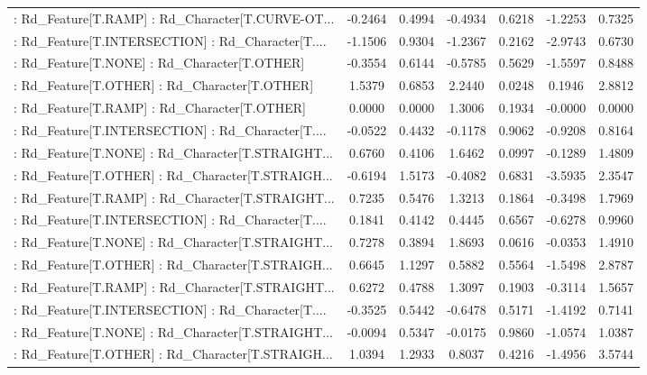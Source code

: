 \begin{longtable}{p{4cm}cccccc}
 : Rd\_Feature[T.RAMP] : Rd\_Character[T.CURVE-OT... & -0.2464 &    0.4994 & -0.4934 &       0.6218 & -1.2253 &  0.7325 \\
 : Rd\_Feature[T.INTERSECTION] : Rd\_Character[T.... & -1.1506 &    0.9304 & -1.2367 &       0.2162 & -2.9743 &  0.6730 \\
 : Rd\_Feature[T.NONE] : Rd\_Character[T.OTHER]      & -0.3554 &    0.6144 & -0.5785 &       0.5629 & -1.5597 &  0.8488 \\
 : Rd\_Feature[T.OTHER] : Rd\_Character[T.OTHER]     &  1.5379 &    0.6853 &  2.2440 &       0.0248 &  0.1946 &  2.8812 \\
 : Rd\_Feature[T.RAMP] : Rd\_Character[T.OTHER]      &  0.0000 &    0.0000 &  1.3006 &       0.1934 & -0.0000 &  0.0000 \\
 : Rd\_Feature[T.INTERSECTION] : Rd\_Character[T.... & -0.0522 &    0.4432 & -0.1178 &       0.9062 & -0.9208 &  0.8164 \\
 : Rd\_Feature[T.NONE] : Rd\_Character[T.STRAIGHT... &  0.6760 &    0.4106 &  1.6462 &       0.0997 & -0.1289 &  1.4809 \\
 : Rd\_Feature[T.OTHER] : Rd\_Character[T.STRAIGH... & -0.6194 &    1.5173 & -0.4082 &       0.6831 & -3.5935 &  2.3547 \\
 : Rd\_Feature[T.RAMP] : Rd\_Character[T.STRAIGHT... &  0.7235 &    0.5476 &  1.3213 &       0.1864 & -0.3498 &  1.7969 \\
 : Rd\_Feature[T.INTERSECTION] : Rd\_Character[T.... &  0.1841 &    0.4142 &  0.4445 &       0.6567 & -0.6278 &  0.9960 \\
 : Rd\_Feature[T.NONE] : Rd\_Character[T.STRAIGHT... &  0.7278 &    0.3894 &  1.8693 &       0.0616 & -0.0353 &  1.4910 \\
 : Rd\_Feature[T.OTHER] : Rd\_Character[T.STRAIGH... &  0.6645 &    1.1297 &  0.5882 &       0.5564 & -1.5498 &  2.8787 \\
 : Rd\_Feature[T.RAMP] : Rd\_Character[T.STRAIGHT... &  0.6272 &    0.4788 &  1.3097 &       0.1903 & -0.3114 &  1.5657 \\
 : Rd\_Feature[T.INTERSECTION] : Rd\_Character[T.... & -0.3525 &    0.5442 & -0.6478 &       0.5171 & -1.4192 &  0.7141 \\
 : Rd\_Feature[T.NONE] : Rd\_Character[T.STRAIGHT... & -0.0094 &    0.5347 & -0.0175 &       0.9860 & -1.0574 &  1.0387 \\
 : Rd\_Feature[T.OTHER] : Rd\_Character[T.STRAIGH... &  1.0394 &    1.2933 &  0.8037 &       0.4216 & -1.4956 &  3.5744 \\

\end{longtable}
